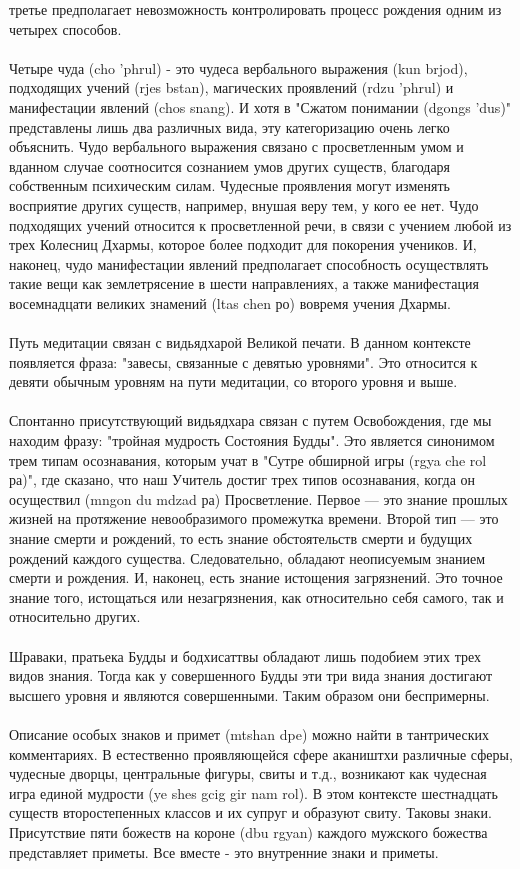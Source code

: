 \begin{siderules}
третье предполагает невозможность контролировать процесс рождения одним из четырех
способов.\\
\\
Четыре чуда (cho 'phrul) - это чудеса вербального выражения (kun brjod), подходящих учений
(rjes bstan), магических проявлений (rdzu 'phrul) и манифестации явлений (chos snang). И
хотя в "Сжатом понимании (dgongs 'dus)" представлены лишь два различных вида, эту
категоризацию очень легко объяснить. Чудо вербального выражения связано с
просветленным умом и вданном случае соотносится сознанием умов других существ,
благодаря собственным психическим силам. Чудесные проявления могут изменять
восприятие других существ, например, внушая веру тем, у кого ее нет. Чудо подходящих
учений относится к просветленной речи, в связи с учением любой из трех Колесниц Дхармы,
которое более подходит для покорения учеников. И, наконец, чудо манифестации явлений
предполагает способность осуществлять такие вещи как землетрясение в шести
направлениях, а также манифестация восемнадцати великих знамений (ltas chen ро) вовремя
учения Дхармы.\\
\\
Путь медитации связан с видьядхарой Великой печати. В данном контексте появляется
фраза: "завесы, связанные с девятью уровнями". Это относится к девяти обычным уровням
на пути медитации, со второго уровня и выше.\\
\\
Спонтанно присутствующий видьядхара связан с путем Освобождения, где мы находим
фразу: "тройная мудрость Состояния Будды". Это является синонимом трем типам
осознавания, которым учат в "Сутре обширной игры (rgya che rol ра)", где сказано, что наш
Учитель достиг трех типов осознавания, когда он осуществил (mngon du mdzad ра)
Просветление. Первое — это знание прошлых жизней на протяжение невообразимого
промежутка времени. Второй тип — это знание смерти и рождений, то есть знание
обстоятельств смерти и будущих рождений каждого существа. Следовательно, обладают
неописуемым знанием смерти и рождения. И, наконец, есть знание истощения загрязнений.
Это точное знание того, истощаться или незагрязнения, как относительно себя самого, так и
относительно других.\\
\\
Шраваки, пратьека Будды и бодхисаттвы обладают лишь подобием этих трех видов знания.
Тогда как у совершенного Будды эти три вида знания достигают высшего уровня и являются
совершенными. Таким образом они беспримерны.\\
\\
Описание особых знаков и примет (mtshan dpe) можно найти в тантрических комментариях.
В естественно проявляющейся сфере акаништхи различные сферы, чудесные дворцы,
центральные фигуры, свиты и т.д., возникают как чудесная игра единой мудрости (ye shes
gcig gir nam rol). В этом контексте шестнадцать существ второстепенных классов и их
супруг и образуют свиту. Таковы знаки. Присутствие пяти божеств на короне (dbu rgyan)
каждого мужского божества представляет приметы. Все вместе - это внутренние знаки и
приметы.
\end{siderules}
